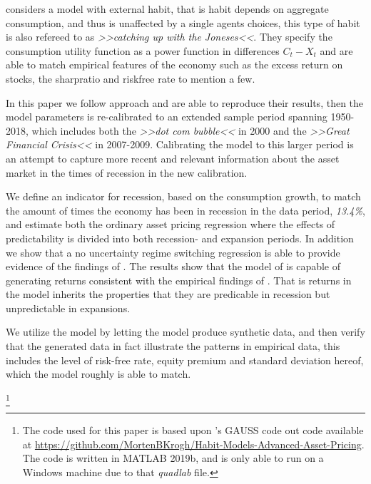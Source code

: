 \citet{Campbell1999} considers a model with external habit, that is habit depends on aggregate consumption, and thus is unaffected by a single agents choices, this type of habit is also refereed to as \textit{>>catching up with the Joneses<<}. They specify the consumption utility function as a power function in differences $C_t - X_t$ and are able to match empirical features of the economy such as the excess return on stocks, the sharpratio and riskfree rate to mention a few. 

In this paper we follow \citet{Campbell1999} approach and are able to reproduce their results, then the model parameters is re-calibrated to an extended sample period spanning  1950-2018, which includes both the \textit{>>dot com bubble<<} in 2000 and the \textit{>>Great Financial Crisis<<} in 2007-2009.
Calibrating the model to this larger period is an attempt to capture more recent and relevant information about the asset market in the times of recession in the new calibration. 

We define an indicator for recession, based on the consumption growth, to match the amount of times the economy has been in recession in the data period, \textit{13.4\%}, and estimate both the ordinary asset pricing regression where the effects of predictability is divided into both recession- and expansion periods. In addition we show that a no uncertainty regime switching regression is able to provide evidence of the findings of \citet{Henkel2011}. 
The results show that the model of \citet{Campbell1999} is capable of generating returns consistent with the empirical findings of \citet{Henkel2011}. That is returns in the model inherits the properties that they are predicable in recession but unpredictable in expansions.



We utilize the model by letting the model produce synthetic data, and then verify that the generated data in fact illustrate the patterns in empirical data, this includes the level of risk-free rate, equity premium and standard deviation hereof, which the model roughly is able to match. 





\footnote{The code used for this paper is based upon \cite{Campbell1999}'s GAUSS code out code available at \url{https://github.com/MortenBKrogh/Habit-Models-Advanced-Asset-Pricing}. The code is written in MATLAB 2019b, and is only able to run on a Windows machine due to that \textit{quadlab} file.}















